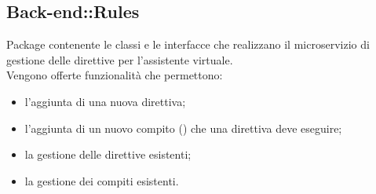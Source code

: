 \FloatBarrier

\subsection{Back-end::Rules}
Package contenente le classi e le interfacce che realizzano il microservizio di gestione delle direttive per l'assistente virtuale.\\
Vengono offerte funzionalità che permettono:
\begin{itemize}
\item l'aggiunta di una nuova direttiva;
\item l'aggiunta di un nuovo compito () che una direttiva deve eseguire;
\item la gestione delle direttive esistenti;
\item la gestione dei compiti esistenti.
\end{itemize}

